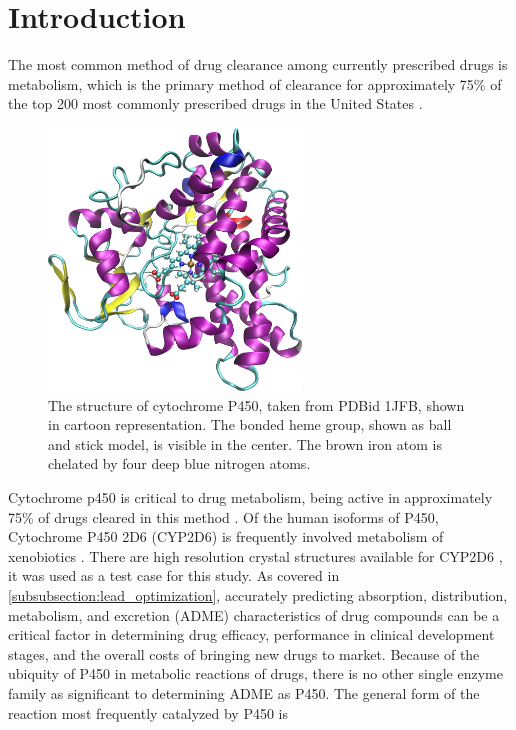 \section{Introduction}
\label{section:p450/introduction}
The most common method of drug clearance among currently prescribed drugs is metabolism, which is the primary method of clearance for approximately 75\% of the top 200 most commonly prescribed drugs in the United States \cite{williams2004drug}.
\begin{figure}[h]
\centering
\includegraphics[width=0.6\textwidth]{figures/p450.png}
\caption{The structure of cytochrome P450, taken from PDBid 1JFB, shown in cartoon representation.
The bonded heme group, shown as ball and stick model, is visible in the center.
The brown iron atom is chelated by four deep blue nitrogen atoms.}
\label{fig:p450}
\end{figure}
Cytochrome p450 is critical to drug metabolism, being active in approximately 75\% of drugs cleared in this method \cite{guengerich2007cytochrome}.
Of the human isoforms of P450, Cytochrome P450 2D6 (CYP2D6) is frequently involved metabolism of xenobiotics \cite{williams2004drug}.
There are high resolution crystal structures available for CYP2D6 \cite{rowland2006crystal}, it was used as a test case for this study.
As covered in \ref{subsubsection:lead_optimization}, accurately predicting  absorption, distribution, metabolism, and excretion (ADME) characteristics of drug compounds can be a critical factor in determining drug efficacy, performance in clinical development stages, and the overall costs of bringing new drugs to market.
Because of the ubiquity of P450 in metabolic reactions of drugs, there is no other single enzyme family as significant to determining ADME as P450.
The general form of the reaction most frequently catalyzed by P450 is 


